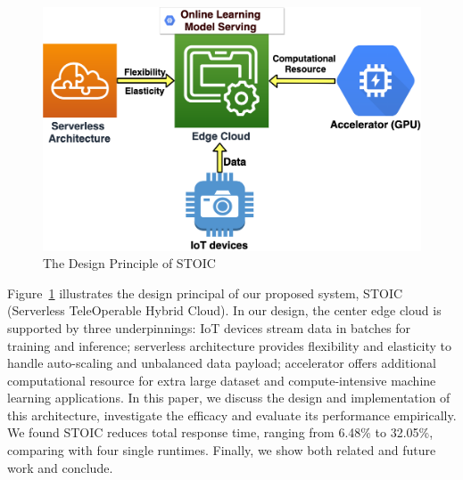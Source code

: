 \begin{figure}
    \centering
    \includegraphics[scale=0.25]{figures/edge}
    \caption{The Design Principle of STOIC }
    \label{fig:edge}
\end{figure}

Figure~\ref{fig:edge} illustrates the design principal of our proposed system, STOIC (Serverless TeleOperable Hybrid Cloud). In our design, the center edge cloud is supported by three underpinnings: IoT devices stream data in batches for training and inference; serverless architecture provides flexibility and elasticity to handle auto-scaling and unbalanced data payload; accelerator offers additional computational resource for extra large dataset and compute-intensive machine learning applications. In this paper, we discuss the design and implementation of this architecture, investigate the efficacy and evaluate its performance empirically. We found STOIC reduces total response time, ranging from 6.48\% to 32.05\%, comparing with four single runtimes. Finally, we show both related and future work and conclude.
